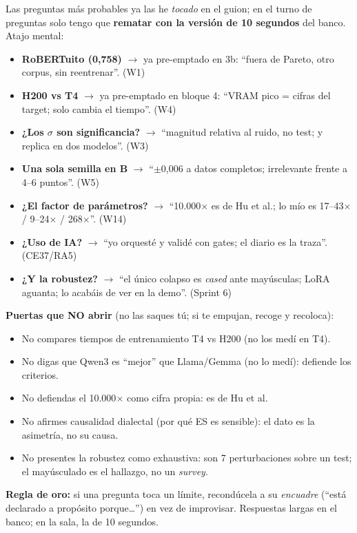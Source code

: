 \documentclass[11pt,a4paper]{article}
\begin{document}
\noindent Las preguntas más probables ya las he \emph{tocado} en el guion; en el turno de preguntas
solo tengo que \textbf{rematar con la versión de 10 segundos} del banco. Atajo mental:

\begin{itemize}[leftmargin=1.4em,itemsep=2.5pt]
  \item \textbf{RoBERTuito (0,758)} $\rightarrow$ ya pre-emptado en 3b: ``fuera de Pareto, otro corpus, sin reentrenar''. (W1)
  \item \textbf{H200 vs T4} $\rightarrow$ ya pre-emptado en bloque 4: ``VRAM pico = cifras del target; solo cambia el tiempo''. (W4)
  \item \textbf{¿Los $\sigma$ son significancia?} $\rightarrow$ ``magnitud relativa al ruido, no test; y replica en dos modelos''. (W3)
  \item \textbf{Una sola semilla en B} $\rightarrow$ ``$\pm$0,006 a datos completos; irrelevante frente a 4--6 puntos''. (W5)
  \item \textbf{¿El factor de parámetros?} $\rightarrow$ ``10.000$\times$ es de Hu et al.; lo mío es 17--43$\times$ / 9--24$\times$ / 268$\times$''. (W14)
  \item \textbf{¿Uso de IA?} $\rightarrow$ ``yo orquesté y validé con gates; el diario es la traza''. (CE37/RA5)
  \item \textbf{¿Y la robustez?} $\rightarrow$ ``el único colapso es \emph{cased} ante mayúsculas; LoRA aguanta; lo acabáis de ver en la demo''. (Sprint 6)
\end{itemize}

\noindent\textbf{Puertas que NO abrir} (no las saques tú; si te empujan, recoge y recoloca):
\begin{itemize}[leftmargin=1.4em,itemsep=2pt]
  \item No compares tiempos de entrenamiento T4 vs H200 (no los medí en T4).
  \item No digas que Qwen3 es ``mejor'' que Llama/Gemma (no lo medí): defiende los criterios.
  \item No defiendas el 10.000$\times$ como cifra propia: es de Hu et al.
  \item No afirmes causalidad dialectal (por qué ES es sensible): el dato es la asimetría, no su causa.
  \item No presentes la robustez como exhaustiva: son 7 perturbaciones sobre un test; el mayúsculado es el hallazgo, no un \emph{survey}.
\end{itemize}

\noindent\textbf{Regla de oro:} si una pregunta toca un límite, recondúcela a su \emph{encuadre}
(``está declarado a propósito porque\ldots'') en vez de improvisar. Respuestas largas en el banco;
en la sala, la de 10 segundos.
\end{document}
